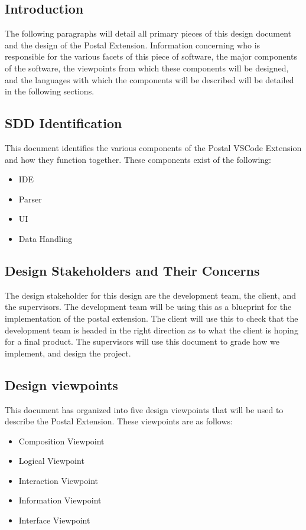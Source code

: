 \documentclass[letterpaper,10pt,titlepage,draftclsnofoot,onecolumn,onesided] {IEEEtran}
\begin{document}
\subsection{Introduction}
The following paragraphs will detail all primary pieces of this design document and the design of the Postal Extension. 
Information concerning who is responsible for the various facets of this piece of software, the major components of the software, the viewpoints from which these components will be designed, and the languages with which the components will be described will be detailed in the following sections.

\subsection{SDD Identification}
This document identifies the various components of the Postal VSCode Extension and how they function together. These components exist of the following:
\begin{itemize}
\item IDE
\item Parser
\item UI
\item Data Handling
\end{itemize}

\subsection{Design Stakeholders and Their Concerns}
The design stakeholder for this design are the development team, the client, and the supervisors.
The development team will be using this as a blueprint for the implementation of the postal extension. 
The client will use this to check that the development team is headed in the right direction as to what the client is hoping for a final product.
The supervisors will use this document to grade how we implement, and design the project.

\subsection{Design viewpoints}
This document has organized into five design viewpoints that will be used to describe the Postal Extension.
These viewpoints are as follows:
\begin {itemize}
	\item Composition Viewpoint
	\item Logical Viewpoint
	\item Interaction Viewpoint
	\item Information Viewpoint
	\item Interface Viewpoint
\end {itemize}
\end{document}
